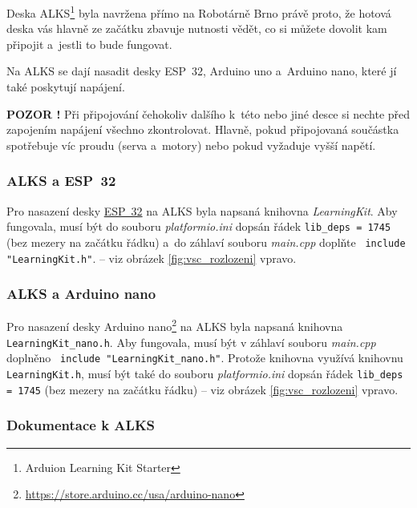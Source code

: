 Deska ALKS\footnote{Arduion Learning Kit Starter} byla navržena přímo na Robotárně Brno právě proto, že 
hotová deska   
vás hlavně ze začátku zbavuje nutnosti vědět, co si můžete dovolit kam připojit a~jestli to bude fungovat. 

Na ALKS se dají nasadit desky ESP~32, Arduino uno  a~Arduino nano, které jí také poskytují napájení.  

{\bf POZOR !} Při připojování čehokoliv dalšího k~této nebo jiné desce si nechte před zapojením napájení všechno zkontrolovat. Hlavně, pokud připojovaná součástka spotřebuje víc proudu (serva a~motory) nebo pokud vyžaduje vyšší napětí. 

\subsubsection*{ALKS a ESP~32}

Pro nasazení desky   \hyperref[esp32]{ESP~32}
 na ALKS byla  napsaná knihovna {\it LearningKit}. 
Aby fungovala, musí být do souboru {\it platformio.ini} dopsán řádek 
{\tt lib\_deps = 1745} (bez mezery na začátku řádku) a~do záhlaví souboru {\it main.cpp} doplňte 
\verb| include "LearningKit.h"|.
 -- viz obrázek \ref{fig:vsc_rozlozeni} vpravo.

\label{alks:nano} \subsubsection*{ALKS a Arduino nano}

Pro nasazení desky Arduino nano\footnote{\url{https://store.arduino.cc/usa/arduino-nano}} 
na ALKS byla  napsaná knihovna \newline
{\tt LearningKit\_nano.h}. 
Aby fungovala, musí být v záhlaví souboru {\it main.cpp} doplněno
\verb| include "LearningKit_nano.h"|. Protože knihovna  využívá 
knihovnu {\tt LearningKit.h}, musí být také do souboru {\it platformio.ini} dopsán řádek {\tt lib\_deps = 1745} (bez mezery na začátku řádku)  -- viz obrázek \ref{fig:vsc_rozlozeni} vpravo.



\subsubsection*{Dokumentace k ALKS}

